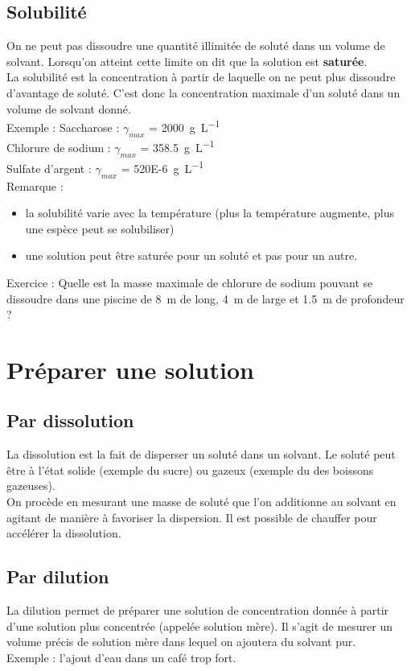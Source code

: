 \documentclass[a4paper,11pt,fleqn]{article}%
\begin{document}
	\subsection{Solubilité}
	On ne peut pas dissoudre une quantité illimitée de soluté dans un volume de solvant. Lorsqu'on atteint cette limite on dit que la solution est \textbf{saturée}.\\
	La solubilité est la concentration à partir de laquelle on ne peut plus dissoudre d'avantage de soluté. C'est donc la concentration maximale d'un soluté dans un volume de solvant donné.\\
	\textcolor{green!50!black}{Exemple : Saccharose : $\gamma_{max}$ = \SI{2000}{\gram\per\liter}\\
	Chlorure de sodium : $\gamma_{max}$ = \SI{358,5}{\gram\per\liter}\\
	Sulfate d'argent : $\gamma_{max}$ = \SI{520E-6}{\gram\per\liter}}\\
	Remarque :
	\begin{itemize}
		\item la solubilité varie avec la température (plus la température augmente, plus une espèce peut se solubiliser)
		\item une solution peut être saturée pour un soluté et pas pour un autre.
	\end{itemize}
	\textcolor{purple!50!black}{Exercice : Quelle est la masse maximale de chlorure de sodium pouvant se dissoudre dans une piscine de \SI{8}{m} de long, \SI{4}{m} de large et \SI{1,5}{m} de profondeur ?}
	\vspace{2cm}

\section{Préparer une solution}
	\subsection{Par dissolution}
	La dissolution est la fait de disperser un soluté dans un solvant. Le soluté peut être à l'état solide (exemple du sucre) ou gazeux (exemple du  des boissons gazeuses).\\
	On procède  en mesurant une masse de soluté  que l'on additionne au solvant en agitant de manière à favoriser la dispersion. Il est possible de chauffer pour accélérer la dissolution.
	\subsection{Par dilution}
	La dilution permet de préparer une solution de concentration donnée à partir d'une solution plus concentrée (appelée solution mère). Il s'agit de mesurer un volume précis de solution mère dans lequel on ajoutera du solvant pur.\\
	\textcolor{green!50!black}{Exemple : l'ajout d'eau dans un café trop fort.}
\end{document}
